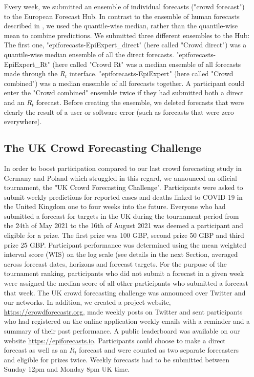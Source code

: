 \documentclass[10pt,a4paper,twocolumn]{article}
\begin{document}
Every week, we submitted an ensemble of individual forecasts ("crowd forecast") to the European Forecast Hub. In contrast to the ensemble of human forecasts described in \citet{bosseComparingHumanModelbased2022}, we used the quantile-wise median, rather than the quantile-wise mean to combine predictions. %
We submitted three different ensembles to the Hub: The first one, "epiforecasts-EpiExpert\_direct" (here called "Crowd direct") was a quantile-wise median ensemble of all the direct forecasts. "epiforecasts-EpiExpert\_Rt" (here called "Crowd Rt" was a median ensemble of all forecasts made through the $R_t$ interface. "epiforecasts-EpiExpert" (here called "Crowd combined") was a median ensemble of all forecasts together. A participant could enter the "Crowd combined" ensemble twice if they had submitted both a direct and an $R_t$ forecast. Before creating the ensemble, we deleted forecasts that were clearly the result of a user or software error (such as forecasts that were zero everywhere).

\subsection*{The UK Crowd Forecasting Challenge}

In order to boost participation compared to our last crowd forecasting study in Germany and Poland \citep{bosseComparingHumanModelbased2022} which struggled in this regard, we announced an official tournament, the "UK Crowd Forecasting Challenge". Participants were asked to submit weekly predictions for reported cases and deaths linked to COVID-19 in the United Kingdom one to four weeks into the future. Everyone who had submitted a forecast for targets in the UK during the tournament period from the 24th of May 2021 to the 16th of August 2021 was deemed a participant and eligible for a prize. The first prize was 100 GBP, second prize 50 GBP and third prize 25 GBP. Participant performance was determined using the mean weighted interval score (WIS) on the log scale (see details in the next Section, %
averaged across forecast dates, horizons and forecast targets. For the purpose of the tournament ranking, participants who did not submit a forecast in a given week were assigned the median score of all other participants who submitted a forecast that week. The UK crowd forecasting challenge was announced over Twitter and our networks. 
In addition, we created a project website, \url{https://crowdforecastr.org}, made weekly posts on Twitter and sent participants who had registered on the online application weekly emails with a reminder and a summary of their past performance. A public leaderboard was available on our website \url{https://epiforecasts.io}. Participants could choose to make a direct forecast as well as an $R_t$ forecast and were counted as two separate forecasters and eligible for prizes twice. Weekly forecasts had to be submitted between Sunday 12pm and Monday 8pm UK time. 
\end{document}
